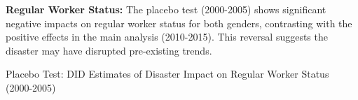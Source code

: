 \documentclass[serif, aspectratio=169]{beamer}
\newcommand{\returnbutton}[2]{%
  \vspace{-1.0cm}  %
  \hfill  %
  \hyperlink{#1}{%
    {\footnotesize\beamerbutton{#2}}%
  }%
  \vspace{0.3cm}  %
}
\begin{document}
\begin{frame}[label=regular_placebo]

\textbf{Regular Worker Status:} The placebo test (2000-2005) shows significant negative impacts on regular worker status for both genders, contrasting with the positive effects in the main analysis (2010-2015). This reversal suggests the disaster may have disrupted pre-existing trends.


\vspace{-1.0cm}
\returnbutton{regular_status}{Return}
\vspace{1.2cm}

\begin{table}[htbp]
\centering
\caption{Placebo Test: DID Estimates of Disaster Impact on Regular Worker Status (2000-2005)}

\vspace{-0.2cm}



\end{table}
\end{frame}
\end{document}
